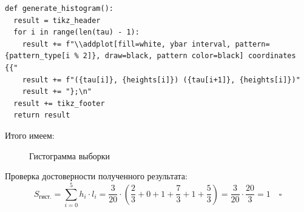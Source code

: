 \begin{lstlisting}[caption=Функция построения гистограммы]
def generate_histogram():
  result = tikz_header
  for i in range(len(tau) - 1):
    result += f"\\addplot[fill=white, ybar interval, pattern={pattern_type[i % 2]}, draw=black, pattern color=black] coordinates {{"
    result += f"({tau[i]}, {heights[i]}) ({tau[i+1]}, {heights[i]})"
    result += "};\n"
  result += tikz_footer
  return result
\end{lstlisting}

Итого имеем:

\begin{figure}[h!]
\centering

\caption{Гистограмма выборки}
\end{figure}

Проверка достоверности полученного результата:
\[
    S_{\text{гист.}}=\sum_{i=0}^5 h_i\cdot l_i=\dfrac{3}{20}\cdot\left(\dfrac{2}{3}+0+1+\dfrac{7}{3}+1+\dfrac{5}{3}\right)=\dfrac{3}{20}\cdot\dfrac{20}{3}=1\quad\square
\]